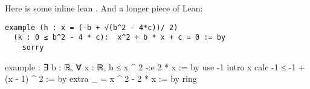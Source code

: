 \documentclass{article}
\begin{document}
Here is some inline lean .
And a longer piece of Lean:

\begin{verbatim}
example (h : x = (-b + √(b^2 - 4*c))/ 2)
  (k : 0 ≤ b^2 - 4 * c):  x^2 + b * x + c = 0 := by
    sorry
\end{verbatim}

\begin{leancode}
example : ∃ b : ℝ, ∀ x : ℝ, b ≤ x ^ 2 -:e  2 * x := by
  use -1
  intro x
  calc
    -1 ≤ -1 + (x - 1) ^ 2 := by extra
    _ = x ^ 2 - 2 * x := by ring
\end{leancode}
\end{document}
